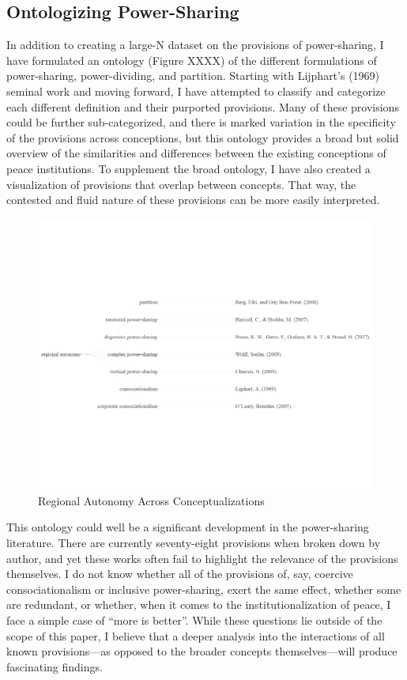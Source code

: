 \documentclass[12pt]{article}
\begin{document}
\subsection{Ontologizing Power-Sharing}
In addition to creating a large-N dataset on the provisions of power-sharing, I have formulated an ontology (Figure XXXX) of the different formulations of power-sharing, power-dividing, and partition. Starting with Lijphart’s (1969) seminal work and moving forward, I have attempted to classify and categorize each different definition and their purported provisions. Many of these provisions could be further sub-categorized, and there is marked variation in the specificity of the provisions across conceptions, but this ontology provides a broad but solid overview of the similarities and differences between the existing conceptions of peace institutions. To supplement the broad ontology, I have also created a visualization of provisions that overlap between concepts. That way, the contested and fluid nature of these provisions can be more easily interpreted.  

\begin{figure}[H]
	\begin{center}
		\includegraphics[width = 6in]{reg_aut_ontology_vis.png}
	\end{center}
\caption{Regional Autonomy Across Conceptualizations}
\end{figure}


This ontology could well be a significant development in the power-sharing literature. There are currently seventy-eight provisions when broken down by author, and yet these works often fail to highlight the relevance of the provisions themselves. I do not know whether all of the provisions of, say, coercive consociationalism or inclusive power-sharing, exert the same effect, whether some are redundant, or whether, when it comes to the institutionalization of peace, I face a simple case of ``more is better''. While these questions lie outside of the scope of this paper, I believe that a deeper analysis into the interactions of all known provisions---as opposed to the broader concepts themselves---will produce fascinating findings. 
\end{document}

